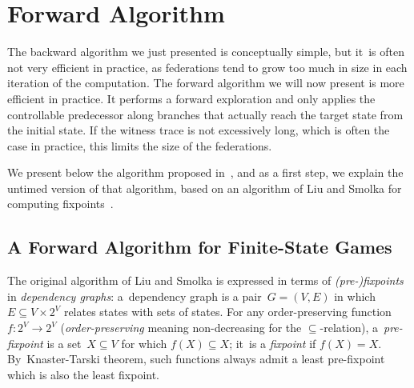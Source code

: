 \section{Forward Algorithm}
%


The backward algorithm we just presented is conceptually simple, but
it~is often not very efficient in practice,
as federations tend to grow too much in size in each iteration of the
computation.
The forward algorithm we will now present is more efficient in practice.
It performs a forward exploration and only applies the controllable predecessor along branches
that actually reach the target state from the initial state. If the witness
trace is not excessively long, which is often the case in practice,
this limits the size of the federations.


We present below the algorithm proposed in~\cite{CDFLL05},
and as a first step, we explain the untimed version of that algorithm,
based on an algorithm of Liu and Smolka for computing
fixpoints~\cite{LS98}.


\subsection*{A Forward Algorithm for Finite-State Games}

The original algorithm of Liu and Smolka is expressed in terms of
\emph{(pre-)fixpoints} in \emph{dependency graphs}: a~dependency graph
is a pair~$G=(V,E)$ in which $E \subseteq V \times 2^V$ relates
states with sets of states.
%
For any order-preserving 
function~$f\colon 2^V\to2^V$
(\emph{order-preserving} meaning non-decreasing for the $\subseteq$-relation),
a~\emph{pre-fixpoint} is a set~$X\subseteq V$ for which $f(X)\subseteq
X$; it~is a \emph{fixpoint} if $f(X)=X$. By~Knaster-Tarski theorem, such
functions always admit a least pre-fixpoint which is also the least fixpoint.
%

